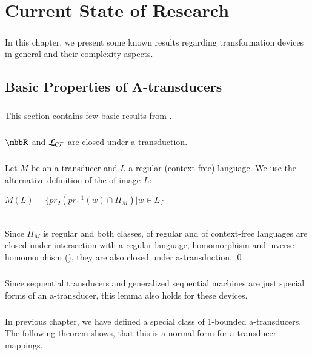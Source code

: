 \chapter{Current State of Research}
\label{chap:currentState}

\paragraph{}
In this chapter, we present some known results regarding transformation devices in general and their complexity aspects.

\section{Basic Properties of A-transducers}
\paragraph{}
This section contains few basic results from \cite{gin:AATPFL}.

\paragraph{}
\clema $\R $ and $\CF $ are closed under a-transduction.

\paragraph{}
\dokaz Let $M$ be an a-transducer and $L$ a regular (context-free) language. We use the alternative definition of the of image $L$:\\
\centerline{$M(L) = \{ pr_{2}(pr_{1}^{-1}(w) \cap \Pi_{M}) | w \in L \}$} \\
Since $\Pi_{M}$ is regular and both classes, of regular and of context-free languages are closed under intersection with a regular language, homomorphism and inverse homomorphism (\cite{hopcroft:fola}), they are also closed under a-transduction. \qed

\paragraph{}
\cdosledok Since sequential transducers and generalized sequential machines are just special forms of an a-transducer, this lemma also holds for these devices.

\paragraph{}
In previous chapter, we have defined a special class of 1-bounded a-transducers. The following theorem shows, that this is a normal form for a-transducer mappings.

